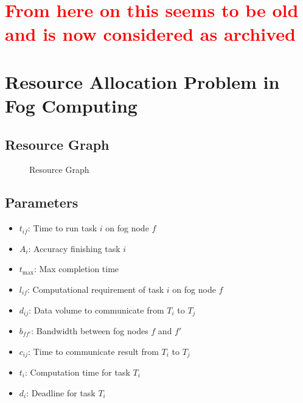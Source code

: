 \documentclass{article}
\begin{document}


\section{\textcolor{red}{From here on this seems to be old and is now considered as archived}}

\section*{Resource Allocation Problem in Fog Computing}

\subsection*{Resource Graph}

\begin{figure}[h]
    \centering
    \caption{Resource Graph}
    \label{fig:resource_graph}
\end{figure}

\subsection*{Parameters}
\begin{itemize}
    \item $t_{if}$: Time to run task $i$ on fog node $f$
    \item $A_i$: Accuracy finishing task $i$
    \item $t_{\max}$: Max completion time
    \item $l_{if}$: Computational requirement of task $i$ on fog node $f$
    \item $d_{ij}$: Data volume to communicate from $T_i$ to $T_j$
    \item $b_{ff'}$: Bandwidth between fog nodes $f$ and $f'$
    \item $c_{ij}$: Time to communicate result from $T_i$ to $T_j$
    \item $t_i$: Computation time for task $T_i$
    \item $d_i$: Deadline for task $T_i$
\end{itemize}
\end{document}
